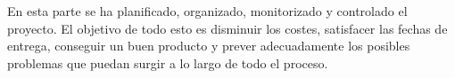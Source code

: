 En esta parte se ha planificado, organizado, monitorizado y controlado el proyecto. 
El objetivo de todo esto es disminuir los costes, satisfacer las fechas de entrega, conseguir un buen producto y prever adecuadamente los posibles problemas que puedan surgir a lo largo de todo el proceso.